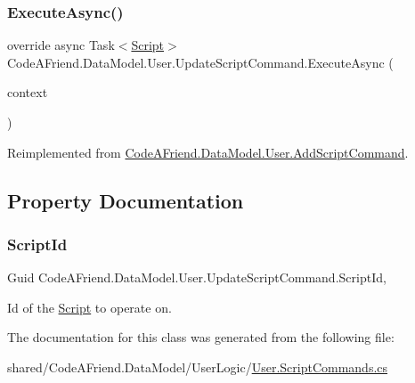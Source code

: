 \subsubsection{\texorpdfstring{Execute\+Async()}{ExecuteAsync()}}
{\footnotesize\ttfamily override async Task$<$\mbox{\hyperlink{class_code_a_friend_1_1_data_model_1_1_script}{Script}}$>$ Code\+A\+Friend.\+Data\+Model.\+User.\+Update\+Script\+Command.\+Execute\+Async (\begin{DoxyParamCaption}\item[{Db\+Context}]{context }\end{DoxyParamCaption})\hspace{0.3cm}{\ttfamily [virtual]}}







Reimplemented from \mbox{\hyperlink{class_code_a_friend_1_1_data_model_1_1_user_1_1_add_script_command_a7105f586c7502c18a3ac2cfd567c90f0}{Code\+A\+Friend.\+Data\+Model.\+User.\+Add\+Script\+Command}}.



\subsection{Property Documentation}
\mbox{\label{class_code_a_friend_1_1_data_model_1_1_user_1_1_update_script_command_a5f8fe92856201f191887693214d7383f}} 
\subsubsection{\texorpdfstring{Script\+Id}{ScriptId}}
{\footnotesize\ttfamily Guid Code\+A\+Friend.\+Data\+Model.\+User.\+Update\+Script\+Command.\+Script\+Id\hspace{0.3cm}{\ttfamily [get]}, {\ttfamily [set]}}



Id of the \mbox{\hyperlink{class_code_a_friend_1_1_data_model_1_1_script}{Script}} to operate on.



The documentation for this class was generated from the following file\+:\begin{DoxyCompactItemize}
\item 
shared/\+Code\+A\+Friend.\+Data\+Model/\+User\+Logic/\mbox{\hyperlink{_user_8_script_commands_8cs}{User.\+Script\+Commands.\+cs}}\end{DoxyCompactItemize}
